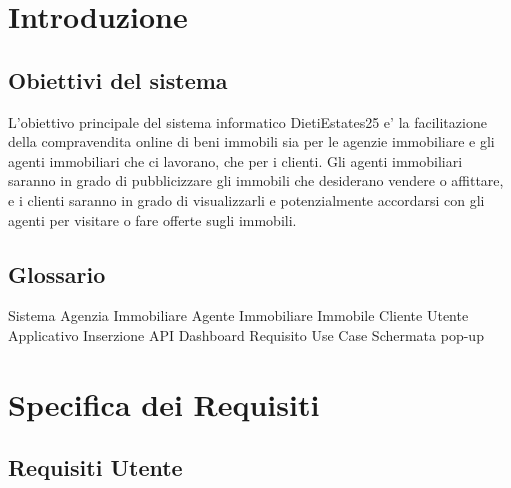 
\chapter{Introduzione}
    \section{Obiettivi del sistema}
        L'obiettivo principale del sistema informatico DietiEstates25 e' la facilitazione della compravendita online di beni immobili sia per le agenzie immobiliare e gli agenti immobiliari che ci lavorano, che per i clienti. Gli agenti immobiliari saranno in grado di pubblicizzare gli immobili che desiderano vendere o affittare, e i clienti saranno in grado di visualizzarli e potenzialmente accordarsi con gli agenti per visitare o fare offerte sugli immobili.
    \section{Glossario}
    Sistema \newline
    Agenzia Immobiliare \newline
    Agente Immobiliare  \newline
    Immobile \newline
    Cliente \newline
    Utente \newline
    Applicativo \newline
    Inserzione \newline
    API \newline
    Dashboard \newline
    Requisito \newline
    Use Case \newline
    Schermata pop-up \newline
    
\chapter{Specifica dei Requisiti}





    \section{Requisiti Utente}
